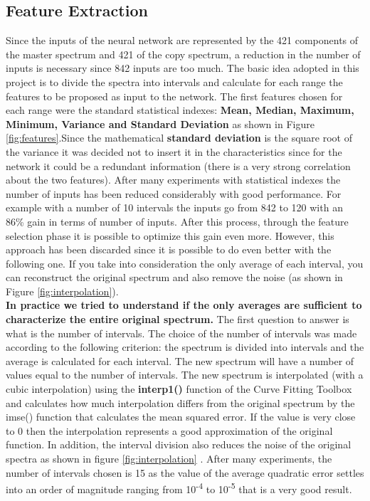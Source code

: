 \documentclass{article}
\begin{document}
\subsection{Feature Extraction} 
Since the inputs of the neural network are represented by the 421 components of the master spectrum and 421 of the copy spectrum, a reduction in the number of inputs is necessary since 842 inputs are too much. The basic idea adopted in this project is to divide the spectra into intervals and calculate for each range the features to be proposed as input to the network. The first features chosen for each range were the standard statistical indexes: \textbf{Mean, Median, Maximum, Minimum, Variance and Standard Deviation} as shown in Figure \ref{fig:features}.Since the mathematical \textbf{standard deviation} is the square root of the variance it was decided not to insert it in the characteristics since for the network it could be a redundant information (there is a very strong correlation about the two features). After many experiments with statistical indexes the number of inputs has been reduced considerably with good performance. For example with a number of 10 intervals the inputs go from 842 to 120 with an 86\% gain in terms of number of inputs. After this process, through the feature selection phase it is possible to optimize this gain even more. However, this approach has been discarded since it is possible to do even better with the following one.
If you take into consideration the only average of each interval, you can reconstruct the original spectrum and also remove the noise (as shown in Figure \ref{fig:interpolation}). \\
\textbf{In practice we tried to understand if the only averages are sufficient to characterize the entire original spectrum.}
The first question to answer is what is the number of intervals.
The choice of the number of intervals was made according to the following criterion: the spectrum is divided into intervals and the average is calculated for each interval. The new spectrum will have a number of values equal to the number of intervals. The new spectrum is interpolated (with a cubic interpolation) using the \textbf{interp1()} function of the Curve Fitting Toolbox and calculates how much interpolation differs from the original spectrum by the imse() function that calculates the mean squared error. If the value is very close to 0 then the interpolation represents a good approximation of the original function. In addition, the interval division also reduces the noise of the original spectra as shown in figure \ref{fig:interpolation} . After many experiments, the number of intervals chosen is 15 as the value of the average quadratic error settles into an order of magnitude ranging from 10\textsuperscript{-4} to 10\textsuperscript{-5} that is a very good result.
\end{document}
